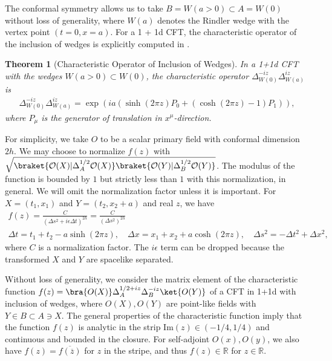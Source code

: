\documentclass[a4paper,11pt]{article}
\newtheorem{theorem}{Theorem}
\theoremstyle{definition}
\theoremstyle{remark}
\newcommand{\lb}{\left(}
\newcommand{\rb}{\right)}
\newcommand{\mO}{\mathcal{O}}
\newcommand{\ep}{\epsilon}
\begin{document}
The conformal symmetry allows us to take $B = W(a>0) \subset A = W(0)$ without loss of generality, where $W(a)$ denotes the Rindler wedge with the vertex point $(t=0,x=a)$. For a 1 + 1d CFT, the characteristic operator of the inclusion of wedges is explicitly computed in \cite{}. 
\begin{theorem}[Characteristic Operator of Inclusion of Wedges]
    In a 1+1d CFT with the wedges $W(a>0) \subset W(0)$, the characteristic operator $\Delta_{W(0)}^{-iz}\Delta_{W(a)}^{iz}$ is 
    \begin{align}
        \Delta_{W(0)}^{-iz}\Delta_{W(a)}^{iz} = \exp\left( ia\lb\sinh(2\pi z)P_0 + (\cosh(2\pi z)-1) P_1\rb\right),
    \end{align}
    where $P_\mu$ is the generator of translation in $x^{\mu}$-direction.
\end{theorem} 
For simplicity, we take $O$ to be a scalar primary field with conformal dimension $2h$. We may choose to normalize $f(z)$ with $\sqrt{\braket{\mO(X)|\Delta_A^{1/2}\mO(X)}\braket{\mO(Y)|\Delta_B^{1/2}\mO(Y)}}$. The modulus of the function is bounded by $1$ but strictly less than $1$ with this normalization, in general. We will omit the normalization factor unless it is important. For $X = (t_1,x_1)$ and $Y = (t_2,x_2+a)$ and real $z$, we have 
\begin{gather}
    f(z) =\frac{C}{(\Delta s^2+i\ep\Delta t)^{2h}} = \frac{C}{(\Delta s^2)^{2h}}\\ %
    \Delta t = t_1+t_2-a\sinh(2\pi z), \quad \Delta x =x_1+x_2 + a\cosh(2\pi z), \quad \Delta s^2 = -\Delta t^2 + \Delta x^2, %
\end{gather}
where $C$ is a normalization factor. The $i\ep$ term can be dropped because the transformed $X$ and $Y$ are spacelike separated.


Without loss of generality, we consider the matrix element of the characteristic function $f(z)=\bra{O(X)}\Delta_A^{1/2+iz}\Delta_B^{-iz}\ket{O(Y)}$ of a CFT in 1+1d with inclusion of wedges, where $O(X),O(Y)$ are point-like fields with $Y\in B \subset A\ni X$. The general properties of the characteristic function imply that the function $f(z)$ is analytic in the strip Im$(z)\in (-1/4,1/4)$ and continuous and bounded in the closure. For self-adjoint $O(x), O(y)$, we also have $f(z) = \overline{f(\overline{z})}$ for $z$ in the stripe, and thus $f(z)\in\mathbb{R}$ for $z\in\mathbb{R}$. 
\end{document}
